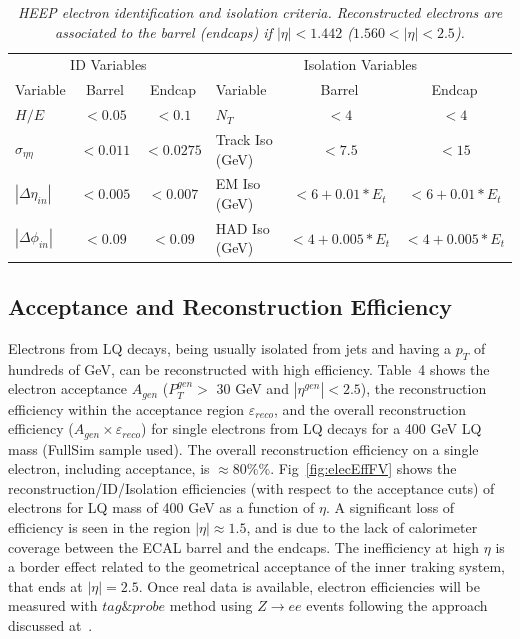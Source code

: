 \begin{table}[htbp]
  \label{tab:HEEPselection}
  \begin{center}
    \begin{tabular}{|lcc|lcc|} \hline
      \multicolumn{3}{|c|}{ID Variables} & \multicolumn{3}{|c|}{Isolation Variables} \\ 
      Variable & Barrel & Endcap & Variable & Barrel & Endcap  \\ \hline
      $H/E$  & $<0.05$ & $<0.1$ & $N_T$  & $<4$ & $<4$ \\ \hline
      $\sigma_{\eta\eta}$  & $<0.011$ & $<0.0275$ & Track Iso (GeV) & $<7.5$ & $<15$ \\ \hline
      $|\Delta\eta_{in}|$  & $<0.005$ & $<0.007$ & EM Iso (GeV) & $<6+0.01*E_{t}$ & $<6+0.01*E_{t}$ \\ \hline
      $|\Delta\phi_{in}|$  & $<0.09$ & $<0.09$ & HAD Iso (GeV) & $<4+0.005*E_{t}$ & $<4+0.005*E_{t}$ \\ \hline
    \end{tabular}
  \caption{\small \sl HEEP electron identification and isolation criteria. Reconstructed electrons are associated to the 
    barrel (endcaps) if $|\eta|<1.442$ ($1.560<|\eta|<2.5$).}
  \end{center}
\end{table}


\subsection{Acceptance and Reconstruction Efficiency} \label{sec:electronEfficiency}

Electrons from LQ decays, being usually isolated from jets and having a $p_{T}$ of 
hundreds of GeV, can be reconstructed with high efficiency. 
Table~4
shows the electron acceptance $A_{gen}$ ($P_{T}^{gen}>$ 30 GeV and $|\eta^{gen}|<2.5$), the 
reconstruction efficiency within the acceptance region $\varepsilon_{reco}$, 
and the overall reconstruction efficiency ($A_{gen} \times \varepsilon_{reco}$) 
for single electrons from LQ decays for a 400 GeV LQ mass (FullSim sample used).
The overall reconstruction efficiency on a single electron, including acceptance, is $\approx 80\%\%$.
Fig~\ref{fig:elecEffFV} shows the reconstruction/ID/Isolation efficiencies
(with respect to the acceptance cuts) of electrons for LQ mass of 400 GeV as a function of $\eta$. 
A significant loss of efficiency is seen in the region $|\eta| \approx 1.5$, 
and is due to the lack of calorimeter coverage between the ECAL barrel and the endcaps. 
The inefficiency at high $\eta$ is a border effect related to the 
geometrical acceptance of the inner traking system, that ends at $|\eta| = 2.5$.
Once real data is available, electron efficiencies will be measured 
with $tag\&probe$ method using $Z \rightarrow ee$ events 
following the approach discussed at~\cite{TagAndProbe}. \\

